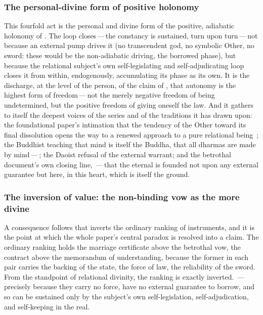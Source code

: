 \subsubsection{The personal-divine form of positive holonomy}
\label{p13:sub:prax-holonomy-divine}

This fourfold act is the personal and divine form of the positive, adiabatic holonomy of . The loop closes\,---\,the constancy is sustained, turn upon turn\,---\,not because an external pump drives it (no transcendent god, no symbolic Other, no sword: these would be the non-adiabatic driving, the borrowed phase), but because the relational subject's own self-legislating and self-adjudicating loop closes it from within, endogenously, accumulating its phase as its own. It is the discharge, at the level of the person, of the claim of , that autonomy is the highest form of freedom\,---\,not the merely negative freedom of being undetermined, but the positive freedom of giving oneself the law. And it gathers to itself the deepest voices of the series and of the traditions it has drawn upon: the foundational paper's intimation that the tendency of the Other toward its final dissolution opens the way to a renewed approach to a pure relational being~\parencite{wanhong_grb}; the Buddhist teaching that mind is itself the Buddha, that all dharmas are made by mind\,---\,; the Daoist refusal of the external warrant; and the betrothal document's own closing line, \,---\,that the eternal is founded not upon any external guarantee but here, in this heart, which is itself the ground.

\subsubsection{The inversion of value: the non-binding vow as the more divine}
\label{p13:sub:prax-inversion}

A consequence follows that inverts the ordinary ranking of instruments, and it is the point at which the whole paper's central paradox is resolved into a claim. The ordinary ranking holds the marriage certificate above the betrothal vow, the contract above the memorandum of understanding, because the former in each pair carries the backing of the state, the force of law, the reliability of the sword. From the standpoint of relational divinity, the ranking is exactly inverted. \,---\,precisely because they carry no force, have no external guarantee to borrow, and so can be sustained only by the subject's own self-legislation, self-adjudication, and self-keeping in the real.

